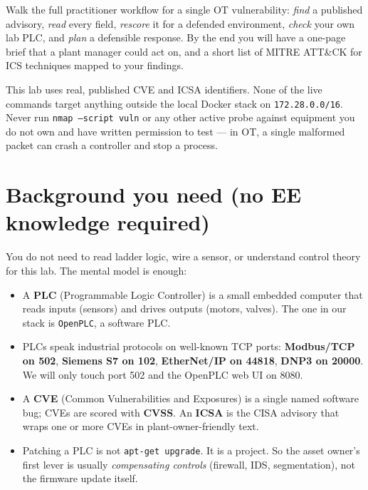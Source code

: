 \documentclass[11pt,a4paper]{article}
\begin{document}
\labheader

\begin{goalbox}
Walk the full practitioner workflow for a single OT vulnerability: \emph{find} a published advisory, \emph{read} every field, \emph{rescore} it for a defended environment, \emph{check} your own lab PLC, and \emph{plan} a defensible response. By the end you will have a one-page brief that a plant manager could act on, and a short list of MITRE ATT\&CK for ICS techniques mapped to your findings.
\end{goalbox}

\begin{warnbox}
This lab uses real, published CVE and ICSA identifiers. None of the live commands target anything outside the local Docker stack on \texttt{172.28.0.0/16}. Never run \texttt{nmap --script vuln} or any other active probe against equipment you do not own and have written permission to test --- in OT, a single malformed packet can crash a controller and stop a process.
\end{warnbox}

\section*{Background you need (no EE knowledge required)}

You do not need to read ladder logic, wire a sensor, or understand control theory for this lab. The mental model is enough:

\begin{itemize}\setlength{\itemsep}{1pt}
  \item A \textbf{PLC} (Programmable Logic Controller) is a small embedded computer that reads inputs (sensors) and drives outputs (motors, valves). The one in our stack is \texttt{OpenPLC}, a software PLC.
  \item PLCs speak industrial protocols on well-known TCP ports: \textbf{Modbus/TCP on 502}, \textbf{Siemens S7 on 102}, \textbf{EtherNet/IP on 44818}, \textbf{DNP3 on 20000}. We will only touch port 502 and the OpenPLC web UI on 8080.
  \item A \textbf{CVE} (Common Vulnerabilities and Exposures) is a single named software bug; CVEs are scored with \textbf{CVSS}. An \textbf{ICSA} is the CISA advisory that wraps one or more CVEs in plant-owner-friendly text.
  \item Patching a PLC is not \texttt{apt-get upgrade}. It is a project. So the asset owner's first lever is usually \emph{compensating controls} (firewall, IDS, segmentation), not the firmware update itself.
\end{itemize}
\end{document}
